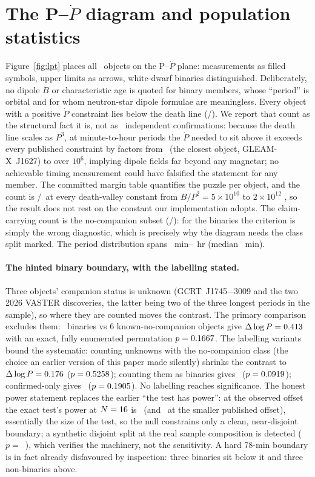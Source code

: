 \documentclass[twocolumn]{aastex631}
\begin{document}
\section{The P--$\dot P$ diagram and population statistics}
Figure~\ref{fig:lpt} places all \lptN\ objects on the P--$\dot P$ plane: measurements as filled
symbols, upper limits as arrows, white-dwarf binaries distinguished. Deliberately,
no dipole $B$ or characteristic age is quoted for binary members, whose ``period'' is
orbital and for whom neutron-star dipole formulae are meaningless. Every object with a positive $\dot P$ constraint lies
below the death line (\lptNdeath/\lptNconstr). We report that count as the structural fact it
is, not as \lptNconstr\ independent confirmations: because the death line scales as $P^{3}$,
at minute-to-hour periods the $\dot P$ needed to sit above it exceeds every published
constraint by factors from \lptMinMargin\ (the closest object, GLEAM-X~J1627) to over
$10^{6}$, implying dipole fields far beyond any magnetar; no achievable timing measurement
could have falsified the statement for any member. The committed margin table quantifies the
puzzle per object, and the count is \lptNdeath/\lptNconstr\ at every death-valley constant
from $B/P^{2}=5\times10^{10}$ to $2\times10^{12}$ \citep[minimum margin
\lptValleyMinMargin;][]{chen1993}, so the result does not rest on the
\citet{bhattacharya1991} constant our implementation adopts. The claim-carrying count is the
no-companion subset (\lptNdeathNonbin/\lptNnonbinConstr): for the binaries the criterion is
simply the wrong diagnostic, which is precisely why the diagram needs the class split marked.
The period distribution spans \lptPmin~min--\lptPmax~hr (median \lptPmed~min).

\paragraph{The hinted binary boundary, with the labelling stated.} Three objects' companion
status is unknown (GCRT~J1745$-$3009 and the two 2026 VASTER discoveries, the latter being
two of the three longest periods in the sample), so where they are counted moves the contrast.
The primary comparison excludes them: \lptNwd\ binaries vs 6 known-no-companion objects give
$\Delta\log P=0.413$ with an exact, fully enumerated permutation $p=0.1667$. The
labelling variants bound the systematic: counting unknowns with the no-companion class (the
choice an earlier version of this paper made silently) shrinks the contrast to
$\Delta\log P=0.176$ ($p=0.5258$); counting them as binaries gives
\lptSplitDAsBin\ ($p=0.0919$); confirmed-only gives \lptSplitDConf\
($p=0.1905$). No labelling reaches significance. The honest power statement replaces
the earlier ``the test has power'': at the observed offset the exact test's power at
$N=16$ is \lptPowerPrimary\ (and \lptPowerPub\ at the smaller published offset),
essentially the size of the test, so the null constrains only a clean, near-disjoint
boundary; a synthetic disjoint split at the real sample composition is detected
($p=$~\lptSynSplitP), which verifies the machinery, not the sensitivity. A hard 78-min
boundary is in fact already disfavoured by inspection: three binaries sit below it and three
non-binaries above.
\end{document}
